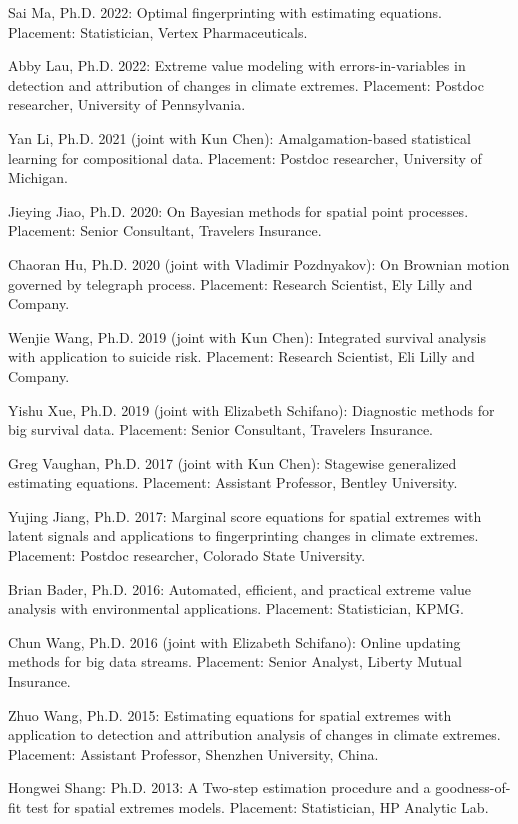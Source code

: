 \documentclass[Statistics]{vita}
\begin{document}
\begin{vita}
\begin{Students}
\begin{Ph.D.}
    \item Sai Ma, Ph.D. 2022: Optimal fingerprinting with estimating equations. Placement: Statistician, Vertex Pharmaceuticals.
    \item Abby Lau, Ph.D. 2022: Extreme value modeling with errors-in-variables in detection and attribution of changes in climate extremes. Placement: Postdoc researcher, University of Pennsylvania.
    \item Yan Li, Ph.D. 2021 (joint with Kun Chen): Amalgamation-based statistical learning for compositional data. Placement: Postdoc researcher, University of Michigan.
    \item Jieying Jiao, Ph.D. 2020: On Bayesian methods for spatial point processes. Placement: Senior Consultant, Travelers Insurance.
    \item Chaoran Hu, Ph.D. 2020 (joint with Vladimir Pozdnyakov): On Brownian motion governed by telegraph process. Placement: Research Scientist, Ely Lilly and Company.
    \item Wenjie Wang, Ph.D. 2019 (joint with Kun Chen): Integrated survival analysis with application to suicide risk. Placement: Research Scientist, Eli Lilly and Company.
    \item Yishu Xue, Ph.D. 2019 (joint with Elizabeth Schifano): Diagnostic methods for big survival data. Placement: Senior Consultant, Travelers Insurance.
    \item Greg Vaughan, Ph.D. 2017 (joint with Kun Chen): Stagewise generalized estimating equations. Placement: Assistant Professor, Bentley University.
    \item Yujing Jiang, Ph.D. 2017: Marginal score equations for spatial extremes with latent signals and applications to fingerprinting changes in climate extremes. Placement: Postdoc researcher, Colorado State University.
    \item Brian Bader, Ph.D. 2016: Automated, efficient, and practical extreme value analysis with environmental applications. Placement: Statistician, KPMG.
    \item Chun Wang, Ph.D. 2016 (joint with Elizabeth Schifano): Online updating methods for big data streams. Placement: Senior Analyst, Liberty Mutual Insurance.
    \item Zhuo Wang, Ph.D. 2015: Estimating equations for spatial extremes with application to detection and attribution analysis of changes in climate extremes. Placement: Assistant Professor, Shenzhen University, China.
    \item Hongwei Shang: Ph.D. 2013: A Two-step estimation procedure and a goodness-of-fit test for spatial extremes models. Placement: Statistician, HP Analytic Lab.

\end{Ph.D.}
\end{Students}
\end{vita}
\end{document}
